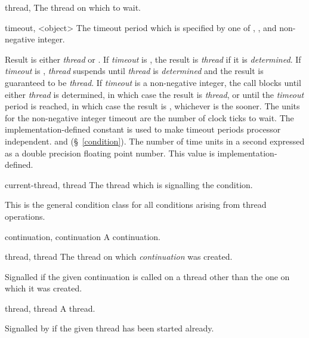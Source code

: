 \begin{optDefinition}
%
\begin{specargs}
    \item[thread, \classref{thread}] The thread on which to wait.
    \item[timeout, <object>] The timeout period which is specified by one of
    \nil{}, \true, and non-negative integer.
\end{specargs}
%
\result%
Result is either {\em thread} or \nil{}.  If {\em timeout} is \nil{}, the result is
{\em thread} if it is {\em determined}.  If {\em timeout} is \true, {\em thread}
suspends until {\em thread} is {\em determined} and the result is guaranteed to
be {\em thread}.  If {\em timeout} is a non-negative integer, the call blocks
until either {\em thread} is determined, in which case the result is {\em
    thread}, or until the {\em timeout} period is reached, in which case the
result is \nil{}, whichever is the sooner.  The units for the non-negative integer
timeout are the number of clock ticks to wait.  The implementation-defined
constant  is used to make timeout periods
processor independent.
%
\seealso%
 and  (\S~\ref{condition}).
%
%
The number of time units in a second expressed as a double precision floating
point number.  This value is
implementation-defined.

%
\begin{initoptions}
    \item[current-thread, thread] The thread which is signalling the condition.
\end{initoptions}
%
\remarks%
This is the general condition class for all conditions arising from
thread operations.

%
\begin{initoptions}
%
    \item[continuation, continuation] A continuation.
%
    \item[thread, thread] The thread on which {\em continuation} was created.
%
\end{initoptions}
%
\remarks%
Signalled if the given continuation is called on a thread other than
the one on which it was created.

%
\begin{initoptions}
    \item[thread, thread] A thread.
\end{initoptions}
%
\remarks%
Signalled by  if the given thread has been started
already.


\end{optDefinition}
